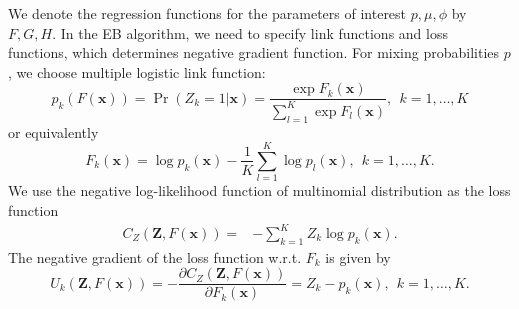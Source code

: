\documentclass[11pt]{article}
\numberwithin{equation}{section}
\def\bx{\boldsymbol{x}}
\def\bZ{\boldsymbol{Z}}
\begin{document}
We denote the regression functions for the parameters of interest $p,\mu,\phi$ by {$F,G,H$}. In the EB algorithm, we need to specify link functions and loss functions, which determines negative gradient function.
For mixing probabilities $p$, we choose multiple logistic link function:	
	\begin{equation}\label{logistic}
		p_k(F(\bx))=\Pr(Z_k=1|\bx)=\frac{\exp{F_k(\bx)}}{\sum_{l=1}^{K}\exp{F_l(\bx)}},~~k=1,\ldots,K
	\end{equation}
	or equivalently
	\begin{equation}\label{inv-logistic}
		F_k(\bx)=\log p_k(\bx)-\frac{1}{K}\sum_{l=1}^K\log p_l(\bx),~~k=1,\ldots,K.
	\end{equation}
We use the negative log-likelihood function of multinomial distribution as the loss function
\begin{equation}
	\begin{aligned}
		{C_{Z}(\bZ, F(\bx))}=& - \sum_{k=1}^K Z_k \log p_k(\bx).
	\end{aligned}
\end{equation}
The negative gradient of the loss function w.r.t. $F_k$ is given by
\begin{equation}
	{U_k(\bZ,F(\bx))}=-\frac{\partial C_{Z}(\bZ,F(\bx))}{\partial F_k(\bx)}=
	Z_k-p_k(\bx), ~~k=1,\ldots,K.
\end{equation}
\end{document}
